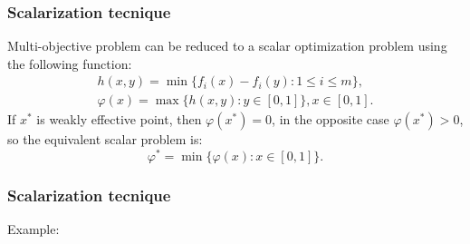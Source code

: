 \documentclass[aspectratio=1610]{beamer}
\begin{document}
\begin{frame}
  \frametitle{Scalarization tecnique}
  Multi-objective problem can be reduced to a scalar optimization problem using the following function:
  \begin{eqnarray*}
    h(x,y)=\min\{f_i(x)-f_i(y):1\leqslant i\leqslant m\}, \\
    \varphi(x)=\max\{h(x,y):y\in [0,1]\},x\in [0,1].
  \end{eqnarray*}
If \(x^*\) is weakly effective point, then \(\varphi(x^*)= 0\), in the opposite case \(\varphi(x^*)> 0\), so
the equivalent scalar problem is:
  \begin{displaymath}
    \varphi^*=\min\{\varphi(x):x\in [0,1]\}.
  \end{displaymath}
\end{frame}

\begin{frame}
  \frametitle{Scalarization tecnique}
  Example:
  \begin{figure}
  \end{figure}
\end{frame}
\end{document}
